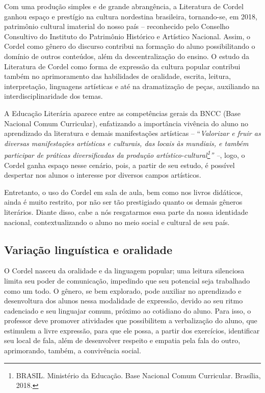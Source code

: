 \documentclass[12pt]{extarticle}
\begin{document}
Com uma produção simples e de grande abrangência, a Literatura de Cordel
ganhou espaço e prestígio na cultura nordestina brasileira, tornando-se,
em 2018, patrimônio cultural imaterial do nosso país -- reconhecido pelo
Conselho Consultivo do Instituto do Patrimônio Histórico e Artístico
Nacional. Assim, o Cordel como gênero do discurso contribui na formação
do aluno possibilitando o domínio de outros conteúdos, além da
descentralização do ensino. O estudo da Literatura de Cordel como forma
de expressão da cultura popular contribui também no aprimoramento das
habilidades de oralidade, escrita, leitura, interpretação, linguagens
artísticas e até na dramatização de peças, auxiliando na
interdisciplinaridade dos temas.

A Educação Literária aparece entre as competências gerais da BNCC (Base
Nacional Comum Curricular), enfatizando a importância vivência do aluno
no aprendizado da literatura e demais manifestações artísticas --
``\emph{Valorizar e fruir as diversas manifestações artísticas e
culturais, das locais às mundiais, e também participar de práticas
diversificadas da produção artístico-cultural\footnote{BRASIL. Ministério da Educação. Base Nacional Comum Curricular.
Brasília, 2018.}'' --},
logo, o Cordel ganha espaço nesse cenário, pois, a partir de seu estudo,
é possível despertar nos alunos o interesse por diversos campos
artísticos.

Entretanto, o uso do Cordel em sala de aula, bem como nos livros
didáticos, ainda é muito restrito, por não ser tão prestigiado quanto os
demais gêneros literários. Diante disso, cabe a nós resgatarmos essa
parte da nossa identidade nacional, contextualizando o aluno no meio
social e cultural de seu país.

\subsection{Variação linguística e oralidade}

O Cordel nasceu da oralidade e da linguagem popular; uma leitura
silenciosa limita seu poder de comunicação, impedindo que seu potencial
seja trabalhado como um todo. O gênero, se bem explorado, pode auxiliar
no aprendizado e desenvoltura dos alunos nessa modalidade de expressão,
devido ao seu ritmo cadenciado e seu linguajar comum, próximo ao
cotidiano do aluno. Para isso, o professor deve promover atividades que
possibilitem a verbalização do aluno, que estimulem a livre expressão,
para que ele possa, a partir dos exercícios, identificar seu local de
fala, além de desenvolver respeito e empatia pela fala do outro,
aprimorando, também, a convivência social.
\end{document}
